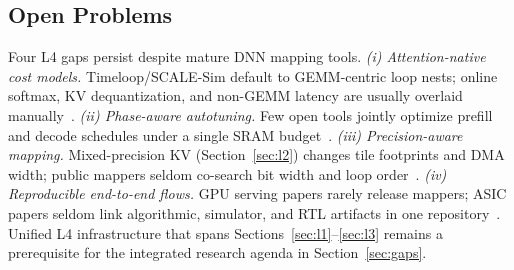 \documentclass[conference]{IEEEtran}
\begin{document}
\begin{table}[t]
\caption{Representative compilation, mapping, and evaluation tools (L4).
TL = Timeloop; Acc = Accelergy; cycle-acc.\ = cycle-accurate.}
\label{tab:l4}
\centering
\scriptsize
\setlength{\tabcolsep}{2pt}
\renewcommand{\arraystretch}{1.05}
\end{table}

\subsection{Open Problems}
\label{sec:l4-open}

Four L4 gaps persist despite mature DNN mapping tools.
\emph{(i) Attention-native cost models.} Timeloop/SCALE-Sim default to GEMM-centric loop nests; online softmax, KV dequantization, and non-GEMM latency are usually overlaid manually~\cite{parashar2019timeloop,scalesimv3_2025,lin2025systolicattention,mive2026}.
\emph{(ii) Phase-aware autotuning.} Few open tools jointly optimize prefill and decode schedules under a single SRAM budget~\cite{plena2025,dao2023flashdecoding,flatattention2026}.
\emph{(iii) Precision-aware mapping.} Mixed-precision KV (Section~\ref{sec:l2}) changes tile footprints and DMA width; public mappers seldom co-search bit width and loop order~\cite{batquant2026,sawint42026,plena2025}.
\emph{(iv) Reproducible end-to-end flows.} GPU serving papers rarely release mappers; ASIC papers seldom link algorithmic, simulator, and RTL artifacts in one repository~\cite{plena2025,klhufek2025transinfersim,sawint42026}.
Unified L4 infrastructure that spans Sections~\ref{sec:l1}--\ref{sec:l3} remains a prerequisite for the integrated research agenda in Section~\ref{sec:gaps}.
\end{document}
